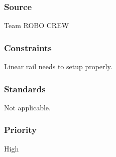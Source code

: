 \subsubsection{Source}
Team ROBO CREW 
\subsubsection{Constraints}
Linear rail needs to setup properly. 
\subsubsection{Standards}
Not applicable. 
\subsubsection{Priority}
High